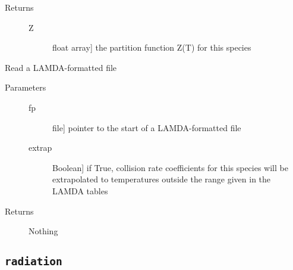 \documentclass[letterpaper,10pt,english]{sphinxmanual}
\begin{document}
\begin{fulllineitems}
\begin{fulllineitems}
\begin{description}
\begin{description}
\end{description}

\item[{Returns}] \leavevmode\begin{description}
\item[{Z}] \leavevmode{[}float \textbar{} array{]}
the partition function Z(T) for this species

\end{description}

\end{description}

\end{fulllineitems}


\begin{fulllineitems}
\label{fulldoc:despotic.emitterData.readLamda}
Read a LAMDA-formatted file
\begin{description}
\item[{Parameters}] \leavevmode\begin{description}
\item[{fp}] \leavevmode{[}file{]}
pointer to the start of a LAMDA-formatted file

\item[{extrap}] \leavevmode{[}Boolean{]}
if True, collision rate coefficients for this species will
be extrapolated to temperatures outside the range given in
the LAMDA tables

\end{description}

\item[{Returns}] \leavevmode
Nothing

\end{description}

\end{fulllineitems}


\end{fulllineitems}



\subsection{\texttt{radiation}}
\label{fulldoc:radiation}
\end{document}
